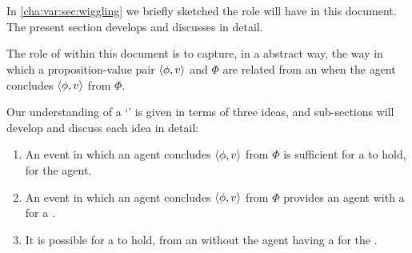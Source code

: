 \section{}
\label{cha:var:ros}

\begin{note}
  In \autoref{cha:var:sec:wiggling} we briefly sketched the role  will have in this document.
  The present section develops and discusses  in detail.

  The role of  within this document is to capture, in a abstract way, the way in which a proposition-value pair \(\langle \phi, v \rangle\) and \poP{} \(\Phi\) are related from an \agpe{} when the agent concludes \(\langle \phi, v \rangle\) from \(\Phi\).
\end{note}

\begin{note}
  Our understanding of a `' is given in terms of three ideas, and sub-sections will develop and discuss each idea in detail:

  \begin{enumerate}[label=, leftmargin=*]
  \item

    An event in which an agent concludes \(\langle \phi, v \rangle\) from \(\Phi\) is sufficient for a \ros{} to hold, for the agent.
  \item

    An event in which an agent concludes \(\langle \phi, v \rangle\) from \(\Phi\) provides an agent with a  for a \ros{}.
  \item

    It is possible for a \ros{} to hold, from an \agpe{} without the agent having a \wit{} for the \ros{}.
  \end{enumerate}
\end{note}

